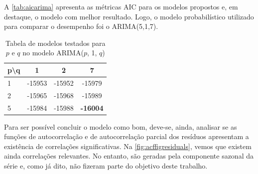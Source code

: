 \documentclass[
    12pt,
    oneside,
    a4paper,
    english,
    brazil
]{abntex2}
\begin{document}
A \autoref{tab:aicarima} apresenta as métricas AIC para os modelos propostos e,
em  destaque, o  modelo com  melhor  resultado. Logo,  o modelo  probabilístico
utilizado para comparar o desempenho foi o ARIMA(5,1,7).

\begin{table}[ht]
\centering
    \caption{Tabela de modelos testados para $p$ e $q$ no modelo ARIMA($p$, 1, $q$)}\label{tab:aicarima}
\begin{tabular}{l c c c}
    p\textbackslash{}q  & 1      & 2      & 7               \\
    \toprule
    1                   & -15953 & -15952 & -15979          \\
    2                   & -15965 & -15968 & -15989          \\
    5                   & -15984 & -15988 & \textbf{-16004} \\
\end{tabular}
\end{table}

Para ser  possível concluir o modelo  como bom, deve-se, ainda,  analisar se as
funções de autocorrelação e de autocorrelação parcial dos resíduos apresentam a
existência  de  correlações significativas.  Na  \autoref{fig:acffigresiduals},
vemos que  existem ainda correlações  relevantes. No entanto, são  geradas pela
componente sazonal  da série  e, como  já dito, não  fizeram parte  do objetivo
deste trabalho.
\end{document}
